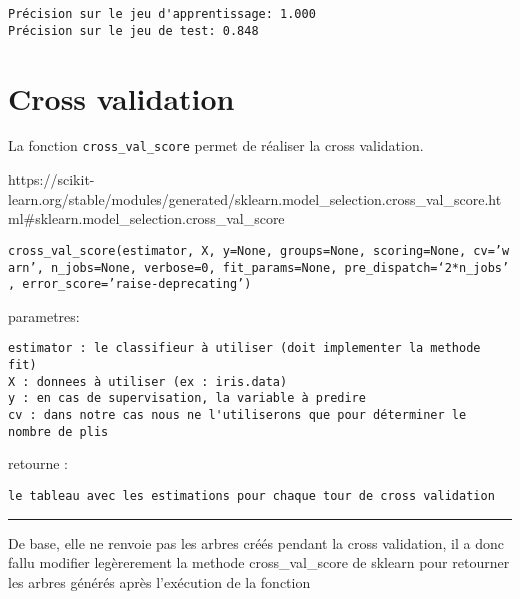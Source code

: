 \documentclass[11pt]{article}
\begin{document}
    \begin{Verbatim}[commandchars=\\\{\}]
Précision sur le jeu d'apprentissage: 1.000
Précision sur le jeu de test: 0.848

    \end{Verbatim}

    \section{Cross validation}\label{cross-validation}

La fonction \texttt{cross\_val\_score} permet de réaliser la cross
validation.

https://scikit-learn.org/stable/modules/generated/sklearn.model\_selection.cross\_val\_score.html\#sklearn.model\_selection.cross\_val\_score

\texttt{cross\_val\_score(estimator,\ X,\ y=None,\ groups=None,\ scoring=None,\ cv=’warn’,\ n\_jobs=None,\ verbose=0,\ fit\_params=None,\ pre\_dispatch=‘2*n\_jobs’,\ error\_score=’raise-deprecating’)}

parametres:

\begin{verbatim}
estimator : le classifieur à utiliser (doit implementer la methode fit)
X : donnees à utiliser (ex : iris.data)
y : en cas de supervisation, la variable à predire
cv : dans notre cas nous ne l'utiliserons que pour déterminer le nombre de plis
\end{verbatim}

retourne :

\begin{verbatim}
le tableau avec les estimations pour chaque tour de cross validation
\end{verbatim}

\begin{center}\rule{0.5\linewidth}{\linethickness}\end{center}

De base, elle ne renvoie pas les arbres créés pendant la cross
validation, il a donc fallu modifier legèrerement la methode
cross\_val\_score de sklearn pour retourner les arbres générés après
l'exécution de la fonction
\end{document}
